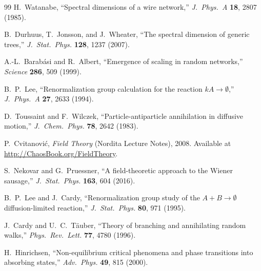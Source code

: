 \documentclass[11pt,a4paper]{article}
\theoremstyle{definition}
\begin{document}
\begin{thebibliography}{99}
H.~Watanabe, ``Spectral dimensions of a wire network,''
\emph{J.\ Phys.\ A} \textbf{18}, 2807 (1985).

B.~Durhuus, T.~Jonsson, and J.~Wheater,
``The spectral dimension of generic trees,''
\emph{J.\ Stat.\ Phys.} \textbf{128}, 1237 (2007).

A.-L.~Barab\'{a}si and R.~Albert,
``Emergence of scaling in random networks,''
\emph{Science} \textbf{286}, 509 (1999).

B.~P.~Lee, ``Renormalization group calculation for the reaction $kA \to \emptyset$,''
\emph{J.\ Phys.\ A} \textbf{27}, 2633 (1994).

D.~Toussaint and F.~Wilczek,
``Particle-antiparticle annihilation in diffusive motion,''
\emph{J.\ Chem.\ Phys.} \textbf{78}, 2642 (1983).

P.~Cvitanovi\'{c}, \emph{Field Theory} (Nordita Lecture Notes), 2008.
Available at \url{http://ChaosBook.org/FieldTheory}.

S.~Nekovar and G.~Pruessner,
``A field-theoretic approach to the Wiener sausage,''
\emph{J.\ Stat.\ Phys.} \textbf{163}, 604 (2016).

B.~P.~Lee and J.~Cardy,
``Renormalization group study of the $A+B\to\emptyset$ diffusion-limited
reaction,''
\emph{J.\ Stat.\ Phys.} \textbf{80}, 971 (1995).

J.~Cardy and U.~C.~T\"auber,
``Theory of branching and annihilating random walks,''
\emph{Phys.\ Rev.\ Lett.} \textbf{77}, 4780 (1996).

H.~Hinrichsen,
``Non-equilibrium critical phenomena and phase transitions into
absorbing states,''
\emph{Adv.\ Phys.} \textbf{49}, 815 (2000).

\end{thebibliography}
\end{document}
